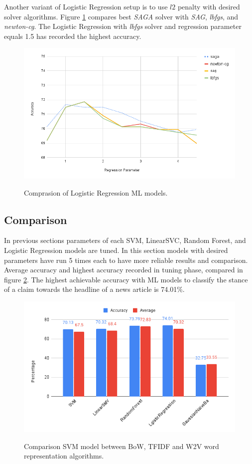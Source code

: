 Another variant of Logistic Regression setup is to use $l2$ penalty with desired solver algorithms. Figure \ref{fig:logistic3} compares best \textit{\ac{SAGA}} solver with \textit{\ac{SAG}}, \textit{lbfgs}, and \textit{newton-cg}. The Logistic Regression with \textit{lbfgs} solver and regression parameter equals 1.5 has recorded the highest accuracy. 
\begin{figure}%
	\centering
	{\includegraphics[width=12.5cm]{statistics/logistic1.png} }
	\caption{Comprasion of Logistic Regression \ac{ML} models.}%
	\label{fig:logistic3}%
\end{figure}

\subsection{Comparison}
In previous sections parameters of each \ac{SVM}, LinearSVC, Random Forest, and Logistic Regression models are tuned. In this section models with desired parameters have run 5 times each to have more reliable results and comparison. Average accuracy and highest accuracy recorded in tuning phase, compared in figure \ref{fig:all}. The highest achievable accuracy with \ac{ML} models to classify the stance of a claim towards the headline of a news article is 74.01\%.
\begin{figure}%
	\centering
	{\includegraphics[width=12.5cm]{statistics/machinlearning.png} }
	\caption{Comparison \ac{SVM} model between \ac{BoW}, \ac{TFIDF} and \ac{W2V} word representation algorithms.}%
	\label{fig:all}%
\end{figure}
